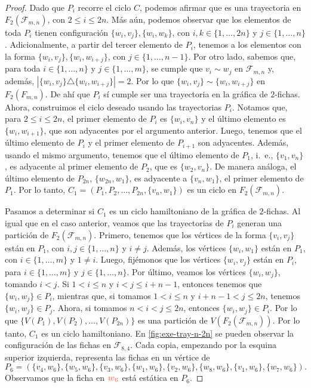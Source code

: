 \begin{proof}
    Dado que $P_i$ recorre el ciclo $C$, podemos afirmar que es
    una trayectoria en $F_2(\mathcal{F}_{m,n})$, con $2\leq i \leq 2n$. M\'as
    a\'un, podemos observar que los elementos de toda $P_i$ tienen
    configuraci\'on $\{w_i,v_j\},\{w_i,w_k\}$, con $i, k\in \{1, \dots, 2n\}$ y
    $j \in \{1, \dots, n\}$. Adicionalmente, a partir del tercer elemento de
    $P_i$, tenemos a los elementos con la forma $\{w_i,v_j\},\{w_i,w_{i+j}\}$,
    con $j \in \{1, \dots, n-1\}$.  Por otro lado, sabemos que, para toda $i \in
    \{1, \dots, n\}$ y $j \in \{1, \dots, m\}$, se cumple que $v_i \sim w_j$ en
    $\mathcal{F}_{m,n}$ y, adem\'as, $|\{w_i,v_j\} \triangle \{w_i,
    w_{i+j}\}|=2$. Por lo que $\{w_i,v_j\} \sim \{w_i, w_{i+j}\}$ en
    $F_2(F_{m,n})$. De ah\'i que $P_i$ s\'i cumple ser una trayectoria en la
    gr\'afica de $2$-fichas. Ahora, construimos el ciclo deseado usando las
    trayectorias $P_i$. Notamos que, para $2 \leq i \leq 2n$, el primer elemento
    de $P_i$ es $\{w_i, v_n\}$ y el \'ultimo elemento es $\{w_i, w_{i+1}\}$, que
    son adyacentes por el argumento anterior. Luego, tenemos que el \'ultimo
    elemento de $P_i$ y el primer elemento de $P_{i+1}$ son adyacentes.
    Adem\'as, usando el mismo argumento, tenemos que el \'ultimo elemento de
    $P_1$, i.~e., $\{v_1,v_n\}$, es adyacente al primer elemento de $P_2$, que
    es $\{w_2,v_n\}$. De manera an\'aloga, el \'ultimo elemento de $P_{2n}$,
    $\{w_{2n},w_1\}$, es adyacente a $\{v_n,w_1\}$, el primer elemento de $P_1$.
    Por lo tanto, $C_1 = (P_1,P_2, \dots, P_{2n},\{v_n,w_1\})$ es un ciclo en
    $F_2(\mathcal{F}_{m,n})$. 

    Pasamos a determinar si $C_1$ es un ciclo hamiltoniano de la gr\'afica de
    $2$-fichas. Al igual que en el caso anterior, veamos que las trayectorias de
    $P_i$ generan una partici\'on de $F_2(\mathcal{F}_{m,n})$. Primero, tenemos
    que los v\'ertices de la forma $\{v_i,v_j\}$ est\'an en $P_1$, con $i,j \in
    \{1, \dots, n\}$ y $i \neq j$. Adem\'as, los v\'ertices $\{w_i,w_1\}$
    est\'an en $P_1$, con $i \in \{1, \dots, m\}$ y $1 \neq i$. Luego,
    fij\'emonos que los v\'ertices $\{w_i,v_j\}$ est\'an en $P_i$, para $i\in
    \{1, \dots, m\}$ y $j \in \{1, \dots, n\}$. Por \'ultimo, veamos los
    v\'ertices $\{w_i,w_j\}$, tomando $i < j$. Si $1 < i \leq n$ y $i < j \leq
    i+n-1$, entonces tenemos que $\{w_i,w_j\} \in P_i$, mientras que, si tomamos
    $1 < i \leq n$ y $i+n-1 < j \leq 2n$, tenemos $\{w_i,w_j\} \in P_j$. Ahora,
    si tomamos $n<i<j \leq 2n$, entonces $\{w_i,w_j\} \in P_i$. Por lo que
    $\{V(P_1),V(P_2), \dots, V(P_{2n})\}$ es una partici\'on de
    $V(F_2(\mathcal{F}_{m,n}))$. Por lo tanto, $C_1$ es un ciclo hamiltoniano.
    En \cref{fig:exe-tray-n-2n} se pueden observar la configuraci\'on de las
    fichas en $\mathcal{F}_{8,4}$. Cada copia, empezando por la esquina superior
    izquierda, representa las fichas en un v\'ertice de 
    \[
        P_6
    =(\{v_4,w_6\},\{w_5,w_6\},\{v_3,w_6\},\{w_1,w_6\},\{v_2,w_6\},\{w_8,w_6\},\{v_1,w_6\},\{w_7,w_6\}).
    \]
   Observamos que la ficha en ${\color{coral}\boldsymbol
    {w_6}}$ est\'a est\'atica en $P_6$.



\end{proof}
